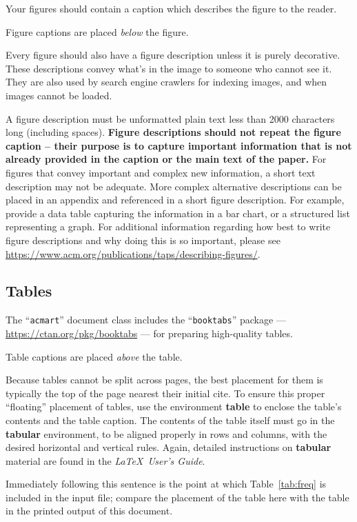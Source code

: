 \documentclass[sigchi]{acmart}
\begin{document}
Your figures should contain a caption which describes the figure to
the reader.

Figure captions are placed {\itshape below} the figure.

Every figure should also have a figure description unless it is purely
decorative. These descriptions convey what’s in the image to someone
who cannot see it. They are also used by search engine crawlers for
indexing images, and when images cannot be loaded.

A figure description must be unformatted plain text less than 2000
characters long (including spaces).  {\bfseries Figure descriptions
  should not repeat the figure caption – their purpose is to capture
  important information that is not already provided in the caption or
  the main text of the paper.} For figures that convey important and
complex new information, a short text description may not be
adequate. More complex alternative descriptions can be placed in an
appendix and referenced in a short figure description. For example,
provide a data table capturing the information in a bar chart, or a
structured list representing a graph.  For additional information
regarding how best to write figure descriptions and why doing this is
so important, please see
\url{https://www.acm.org/publications/taps/describing-figures/}.

\subsection{Tables}

The ``\verb|acmart|'' document class includes the ``\verb|booktabs|''
package --- \url{https://ctan.org/pkg/booktabs} --- for preparing
high-quality tables.

Table captions are placed {\itshape above} the table.

Because tables cannot be split across pages, the best placement for
them is typically the top of the page nearest their initial cite.  To
ensure this proper ``floating'' placement of tables, use the
environment \textbf{table} to enclose the table's contents and the
table caption.  The contents of the table itself must go in the
\textbf{tabular} environment, to be aligned properly in rows and
columns, with the desired horizontal and vertical rules.  Again,
detailed instructions on \textbf{tabular} material are found in the
\textit{\LaTeX\ User's Guide}.

Immediately following this sentence is the point at which
Table~\ref{tab:freq} is included in the input file; compare the
placement of the table here with the table in the printed output of
this document.
\end{document}
